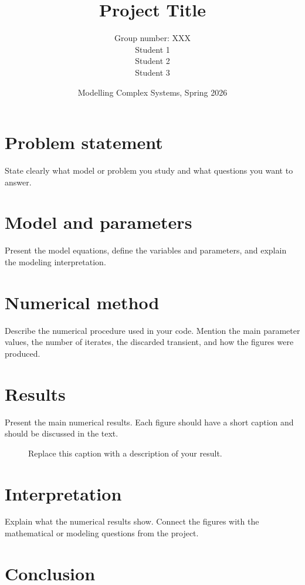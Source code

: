 \documentclass[11pt]{article}
\title{Project Title}
\author{
  Group number: XXX \\
  Student 1 \\
  Student 2 \\
  Student 3
}
\date{Modelling Complex Systems, Spring 2026}
\begin{document}
\maketitle

\section{Problem statement}

State clearly what model or problem you study and what questions you want to answer.

\section{Model and parameters}

Present the model equations, define the variables and parameters, and explain the modeling interpretation.

\section{Numerical method}

Describe the numerical procedure used in your code. Mention the main parameter values, the number of iterates, the discarded transient, and how the figures were produced.

\section{Results}

Present the main numerical results. Each figure should have a short caption and should be discussed in the text.

\begin{figure}[h!]
  \centering
  \caption{Replace this caption with a description of your result.}
\end{figure}

\section{Interpretation}

Explain what the numerical results show. Connect the figures with the mathematical or modeling questions from the project.

\section{Conclusion}
\end{document}
